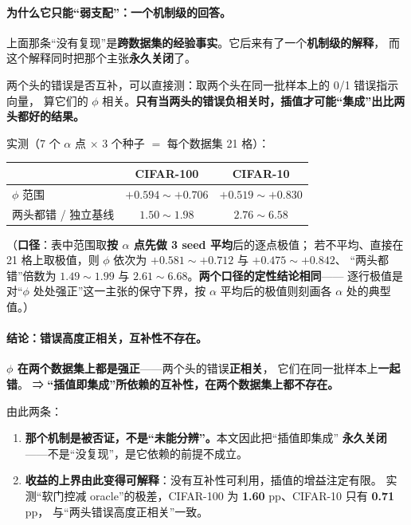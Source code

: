 \documentclass[11pt,a4paper]{ctexart}
\begin{document}
\paragraph{为什么它只能“弱支配”：一个机制级的回答。}
上面那条“没有复现”是\textbf{跨数据集的经验事实}。它后来有了一个\textbf{机制级的解释}，
而这个解释同时把那个主张\textbf{永久关闭}了。

两个头的错误是否互补，可以直接测：取两个头在同一批样本上的 0/1 错误指示向量，
算它们的 $\phi$ 相关。\textbf{只有当两头的错误负相关时，插值才可能“集成”出比两头都好的结果。}

实测（7 个 $\alpha$ 点 $\times$ 3 个种子 $=$ 每个数据集 21 格）：

\begin{center}
\small
\begin{tabular}{lcc}
\toprule
& CIFAR-100 & CIFAR-10 \\
\midrule
$\phi$ 范围 & $+0.594\sim+0.706$ & $+0.519\sim+0.830$ \\
两头都错 / 独立基线 & $1.50\sim1.98$ & $2.76\sim6.58$ \\
\bottomrule
\end{tabular}
\end{center}

（\textbf{口径}：表中范围取\textbf{按 $\alpha$ 点先做 3 seed 平均}后的逐点极值；
若不平均、直接在 21 格上取极值，则 $\phi$ 依次为 $+0.581\sim+0.712$ 与 $+0.475\sim+0.842$、
“两头都错”倍数为 $1.49\sim1.99$ 与 $2.61\sim6.68$。\textbf{两个口径的定性结论相同}——
逐行极值是对“$\phi$ 处处强正”这一主张的保守下界，按 $\alpha$ 平均后的极值则刻画各 $\alpha$ 处的典型值。）

\paragraph{结论：错误高度正相关，互补性不存在。}
\textbf{$\phi$ 在两个数据集上都是强正}——两个头的错误\textbf{正相关}，
它们在同一批样本上\textbf{一起错}。
⇒ \textbf{“插值即集成”所依赖的互补性，在两个数据集上都不存在。}

由此两条：

\begin{enumerate}[leftmargin=2em,itemsep=2pt]
  \item \textbf{那个机制是被否证，不是“未能分辨”。}本文因此把“插值即集成”
        \textbf{永久关闭}——不是“没复现”，是它依赖的前提不成立。
  \item \textbf{收益的上界由此变得可解释}：没有互补性可利用，插值的增益注定有限。
        实测“软门控减 oracle”的极差，CIFAR-100 为 \textbf{1.60} pp、CIFAR-10 只有 \textbf{0.71} pp，
        与“两头错误高度正相关”一致。
\end{enumerate}
\end{document}
